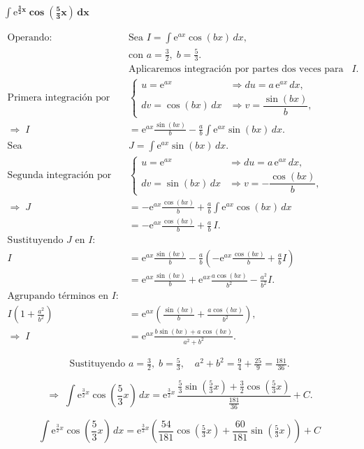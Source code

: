 $
\displaystyle \mathbf{\int \mathrm{e}^{\frac{3}{2}x}\cos\!\left(\frac{5}{3}x\right)\,dx}
$

\nopagebreak
\begin{align*}
\text{Operando: } 
&\text{Sea } I = \int \mathrm{e}^{ax}\cos(bx)\,dx, \\[4pt]
&\text{con } a=\tfrac{3}{2},\; b=\tfrac{5}{3}. \\[6pt]
&\text{Aplicaremos integración por partes dos veces para hallar } I. \\[6pt]
\text{Primera integración por partes: } &
\begin{cases}
u = \mathrm{e}^{ax} &\Rightarrow du = a\,\mathrm{e}^{ax}\,dx,\\[3pt]
dv = \cos(bx)\,dx &\Rightarrow v = \dfrac{\sin(bx)}{b},
\end{cases} \\[6pt]
\Rightarrow\; I
&= \mathrm{e}^{ax}\frac{\sin(bx)}{b}
- \frac{a}{b}\int \mathrm{e}^{ax}\sin(bx)\,dx. \\[6pt]
\text{Sea } &J=\int \mathrm{e}^{ax}\sin(bx)\,dx. \\[6pt]
\text{Segunda integración por partes: } &
\begin{cases}
u = \mathrm{e}^{ax} &\Rightarrow du = a\,\mathrm{e}^{ax}\,dx,\\[3pt]
dv = \sin(bx)\,dx &\Rightarrow v = -\dfrac{\cos(bx)}{b},
\end{cases} \\[6pt]
\Rightarrow\; J
&= -\mathrm{e}^{ax}\frac{\cos(bx)}{b}
+ \frac{a}{b}\int \mathrm{e}^{ax}\cos(bx)\,dx \\[6pt]
&= -\mathrm{e}^{ax}\frac{\cos(bx)}{b} + \frac{a}{b}\,I. \\[6pt]
\text{Sustituyendo } J \text{ en } I: & \\[6pt]
I
&= \mathrm{e}^{ax}\frac{\sin(bx)}{b}
- \frac{a}{b}\!\left( -\mathrm{e}^{ax}\frac{\cos(bx)}{b}
+ \frac{a}{b}I \right) \\[6pt]
&= \mathrm{e}^{ax}\frac{\sin(bx)}{b}
+ \mathrm{e}^{ax}\frac{a\cos(bx)}{b^{2}}
- \frac{a^{2}}{b^{2}}I. \\[6pt]
\text{Agrupando términos en } I: & \\[6pt]
I\!\left(1 + \frac{a^{2}}{b^{2}}\right)
&= \mathrm{e}^{ax}\!\left(\frac{\sin(bx)}{b}
+ \frac{a\cos(bx)}{b^{2}}\right), \\[6pt]
\Rightarrow\;
I
&= \mathrm{e}^{ax}\frac{b\sin(bx) + a\cos(bx)}{a^{2}+b^{2}}.
\end{align*}

$$
\text{Sustituyendo } a=\tfrac{3}{2},\; b=\tfrac{5}{3},
\quad a^{2}+b^{2}=\tfrac{9}{4}+\tfrac{25}{9}=\tfrac{181}{36}.
$$

$$
\Rightarrow\;
\int \mathrm{e}^{\frac{3}{2}x}\cos\!\left(\frac{5}{3}x\right)\,dx
= \mathrm{e}^{\frac{3}{2}x}\,
\frac{\tfrac{5}{3}\sin\!\left(\tfrac{5}{3}x\right)
+\tfrac{3}{2}\cos\!\left(\tfrac{5}{3}x\right)}{\tfrac{181}{36}} + C.
$$

$$
\boxed{\displaystyle 
\int \mathrm{e}^{\frac{3}{2}x}\cos\!\left(\frac{5}{3}x\right)\,dx
= \mathrm{e}^{\frac{3}{2}x}\!\left(
\frac{54}{181}\cos\!\left(\tfrac{5}{3}x\right)
+ \frac{60}{181}\sin\!\left(\tfrac{5}{3}x\right)\right) + C}
$$
